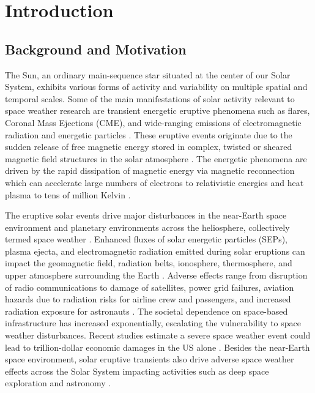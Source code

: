 \chapter{Introduction}
\label{chapter1}

\section{Background and Motivation}
The Sun, an ordinary main-sequence star situated at the center of our Solar System, exhibits various forms of activity and variability on multiple spatial and temporal scales. Some of the main manifestations of solar activity relevant to space weather research are transient energetic eruptive phenomena such as flares, Coronal Mass Ejections (CME), and wide-ranging emissions of electromagnetic radiation and energetic particles \citep{schwenn_2006, pulkkinen_2007}. These eruptive events originate due to the sudden release of free magnetic energy stored in complex, twisted or sheared magnetic field structures in the solar atmosphere \citep{moore_2001, priest_forbes_2007, zhang_2012, amari_2014}. The energetic phenomena are driven by the rapid dissipation of magnetic energy via magnetic reconnection which can accelerate large numbers of electrons to relativistic energies and heat plasma to tens of million Kelvin \citep{shibata_2011, benz_2017}.

The eruptive solar events drive major disturbances in the near-Earth space environment and planetary environments across the heliosphere, collectively termed space weather \citep{schrijver_2010, eastwood_2017}. Enhanced fluxes of solar energetic particles (SEPs), plasma ejecta, and electromagnetic radiation emitted during solar eruptions can impact the geomagnetic field, radiation belts, ionosphere, thermosphere, and upper atmosphere surrounding the Earth \citep{schwenn_2006, pulkkinen_2007}. Adverse effects range from disruption of radio communications to damage of satellites, power grid failures, aviation hazards due to radiation risks for airline crew and passengers, and increased radiation exposure for astronauts \citep{lanzerotti_2001}. The societal dependence on space-based infrastructure has increased exponentially, escalating the vulnerability to space weather disturbances. Recent studies estimate a severe space weather event could lead to trillion-dollar economic damages in the US alone \citep{oughton_2017}. Besides the near-Earth space environment, solar eruptive transients also drive adverse space weather effects across the Solar System impacting activities such as deep space exploration and astronomy \citep{lilensten_2014}.

